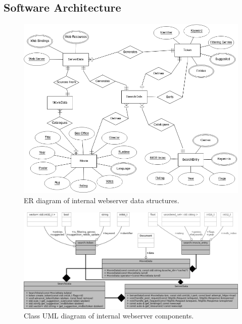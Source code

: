 \documentclass{article}
\begin{document}
\subsection{Software Architecture}
\begin{figure}[H]
\includegraphics[width=\columnwidth]{res/ER diagram.png}
\caption{ER diagram of internal webserver data structures.}
\end{figure}
\begin{figure}[H]
\includegraphics[width=\columnwidth]{res/class_uml_diagram.png}
\caption{Class UML diagram of internal webserver components.}
\end{figure}
\end{document}

